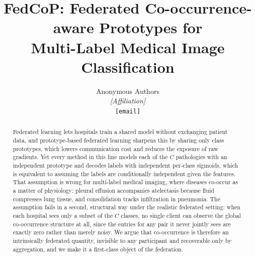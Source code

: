 \documentclass[11pt,a4paper]{article}
\title{FedCoP: Federated Co-occurrence-aware Prototypes for \\
       Multi-Label Medical Image Classification}
\author{
  Anonymous Authors\\
  \textit{[Affiliation]}\\
  \texttt{[email]}
}
\date{}
\theoremstyle{definition}
\begin{document}
\maketitle

\begin{abstract}
Federated learning lets hospitals train a shared model without exchanging patient data, and prototype-based federated learning sharpens this by sharing only class prototypes, which lowers communication cost and reduces the exposure of raw gradients. Yet every method in this line models each of the $C$ pathologies with an independent prototype and decodes labels with independent per-class sigmoids, which is equivalent to assuming the labels are conditionally independent given the features. That assumption is wrong for multi-label medical imaging, where diseases co-occur as a matter of physiology: pleural effusion accompanies atelectasis because fluid compresses lung tissue, and consolidation tracks infiltration in pneumonia. The assumption fails in a second, structural way under the realistic federated setting: when each hospital sees only a subset of the $C$ classes, no single client can observe the global co-occurrence structure at all, since the entries for any pair it never jointly sees are exactly zero rather than merely noisy. We argue that co-occurrence is therefore an intrinsically federated quantity, invisible to any participant and recoverable only by aggregation, and we make it a first-class object of the federation.


\end{abstract}
\end{document}
